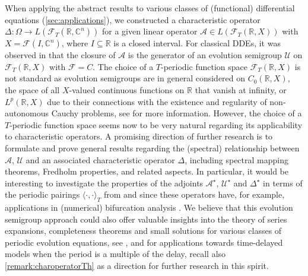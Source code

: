 \documentclass[english]{myarticle}
\begin{document}
\begin{sloppypar}
When applying the abstract results to various classes of (functional) differential equations (\cref{sec:applications}), we constructed a characteristic operator $\Delta : \Omega \to L(\mathcal{F}_T(\mathbb{R},\mathbb{C}^n))$ for a given linear operator $\mathcal{A} \in L(\mathcal{F}_T(\mathbb{R},X))$ with $X = \mathcal{F}(I,\mathbb{C}^n)$, where $I \subseteq \mathbb{R}$ is a closed interval. For classical DDEs, it was observed in \cite[Section 3]{Article2} that the closure of $\mathcal{A}$ is the generator of an evolution semigroup $\mathcal{U}$ on $\mathcal{F}_T(\mathbb{R}, X)$ with $\mathcal{F} = C$. The choice of a $T$-periodic function space $\mathcal{F}_T(\mathbb{R},X)$ is not standard as evolution semigroups are in general considered on $C_0(\mathbb{R},X)$, the space of all $X$-valued continuous functions on $\mathbb{R}$ that vanish at infinity, or $L^p(\mathbb{R},X)$ due to their connections with the existence and regularity of non-autonomous Cauchy problems, see \cite{Engel2000,Chicone1997,Latushkin1996,Latushkin2004,Arendt2009,Nickel1997} for more information. However, the choice of a $T$-periodic function space seems now to be very natural regarding its applicability to characteristic operators. A promising direction of further research is to formulate and prove general results regarding the (spectral) relationship between $\mathcal{A}$, $\mathcal{U}$ and an associated characteristic operator $\Delta$, including spectral mapping theorems, Fredholm properties, and related aspects. In particular, it would be interesting to investigate the properties of the adjoints $\mathcal{A}^\star$, $\mathcal{U}^\star$ and $\Delta^\star$ in terms of the periodic pairings $\langle \cdot, \cdot \rangle_T$ from \cite[Section 3.3]{Article2} and \cite[Section 3]{Bosschaert2025} since these operators have, for example, applications in (numerical) bifurcation analysis \cite{Bosschaert2025,Article2,Kuznetsov2005,Witte2013,Witte2014}. We believe that this evolution semigroup approach could also offer valuable insights into the theory of series expansions, completeness theorems and small solutions for various classes of periodic evolution equations, see \cite[Section 8.3]{Hale1993}, \cite[Section 11]{Kaashoek2022} and \cite[Section 6.2]{Frasson2003} for applications towards time-delayed models when the period is a multiple of the delay, recall also \cref{remark:charoperatorTh} as a direction for further research in this spirit.


\end{sloppypar}
\end{document}
